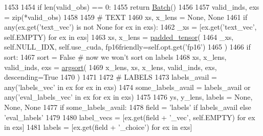 \begin{DoxyCode}
1453 
1454         \textcolor{keywordflow}{if} len(valid\_obs) == 0:
1455             \textcolor{keywordflow}{return} \hyperlink{namespaceparlai_1_1agents_1_1legacy__agents_1_1seq2seq_1_1torch__agent__v1_a74cfde390a2b9861179ac0fcd59da28c}{Batch}()
1456 
1457         valid\_inds, exs = zip(*valid\_obs)
1458 
1459         \textcolor{comment}{# TEXT}
1460         xs, x\_lens = \textcolor{keywordtype}{None}, \textcolor{keywordtype}{None}
1461         \textcolor{keywordflow}{if} any(ex.get(\textcolor{stringliteral}{'text\_vec'}) \textcolor{keywordflow}{is} \textcolor{keywordflow}{not} \textcolor{keywordtype}{None} \textcolor{keywordflow}{for} ex \textcolor{keywordflow}{in} exs):
1462             \_xs = [ex.get(\textcolor{stringliteral}{'text\_vec'}, self.EMPTY) \textcolor{keywordflow}{for} ex \textcolor{keywordflow}{in} exs]
1463             xs, x\_lens = \hyperlink{namespaceparlai_1_1agents_1_1legacy__agents_1_1seq2seq_1_1utils__v1_adb5a414ae439f14c54e8c760b91cc4c8}{padded\_tensor}(
1464                 \_xs, self.NULL\_IDX, self.use\_cuda, fp16friendly=self.opt.get(\textcolor{stringliteral}{'fp16'})
1465             )
1466             \textcolor{keywordflow}{if} sort:
1467                 sort = \textcolor{keyword}{False}  \textcolor{comment}{# now we won't sort on labels}
1468                 xs, x\_lens, valid\_inds, exs = \hyperlink{namespaceparlai_1_1agents_1_1legacy__agents_1_1seq2seq_1_1utils__v1_a1521e559b740f741ebb47b8755202bb2}{argsort}(
1469                     x\_lens, xs, x\_lens, valid\_inds, exs, descending=\textcolor{keyword}{True}
1470                 )
1471 
1472         \textcolor{comment}{# LABELS}
1473         labels\_avail = any(\textcolor{stringliteral}{'labels\_vec'} \textcolor{keywordflow}{in} ex \textcolor{keywordflow}{for} ex \textcolor{keywordflow}{in} exs)
1474         some\_labels\_avail = labels\_avail \textcolor{keywordflow}{or} any(\textcolor{stringliteral}{'eval\_labels\_vec'} \textcolor{keywordflow}{in} ex \textcolor{keywordflow}{for} ex \textcolor{keywordflow}{in} exs)
1475 
1476         ys, y\_lens, labels = \textcolor{keywordtype}{None}, \textcolor{keywordtype}{None}, \textcolor{keywordtype}{None}
1477         \textcolor{keywordflow}{if} some\_labels\_avail:
1478             field = \textcolor{stringliteral}{'labels'} \textcolor{keywordflow}{if} labels\_avail \textcolor{keywordflow}{else} \textcolor{stringliteral}{'eval\_labels'}
1479 
1480             label\_vecs = [ex.get(field + \textcolor{stringliteral}{'\_vec'}, self.EMPTY) \textcolor{keywordflow}{for} ex \textcolor{keywordflow}{in} exs]
1481             labels = [ex.get(field + \textcolor{stringliteral}{'\_choice'}) \textcolor{keywordflow}{for} ex \textcolor{keywordflow}{in} exs]

\end{DoxyCode}
